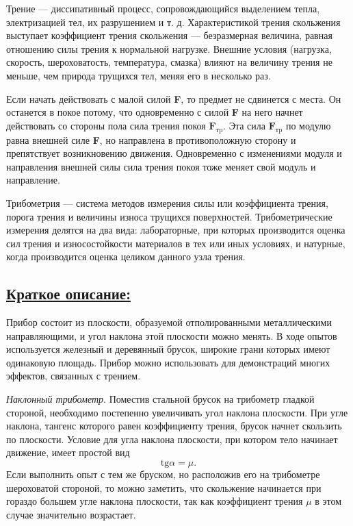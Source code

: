 \documentclass[14pt,a4paper,oneside]{extarticle}	%
\begin{document}
	Трение — диссипативный процесс, 
	сопровождающийся выделением тепла, электризацией тел, их разрушением и т. д. 
	Характеристикой трения скольжения выступает коэффициент трения 
	скольжения — безразмерная величина, равная отношению силы трения к нормальной нагрузке.
	Внешние условия (нагрузка, скорость, 
	 шероховатость, температура, смазка) влияют на величину 
	 трения не меньше, чем природа трущихся тел, меняя его в несколько раз.
	
	Если начать действовать с малой силой \textbf{F}, то предмет не сдвинется с места. 
	Он останется в покое потому, что одновременно с силой \textbf{F} на него начнет действовать со 
	стороны пола сила трения покоя $ \textbf{F}_{\text{тp}} $.
	Эта сила $ \textbf{F}_{\text{тp}} $ по модулю равна внешней силе \textbf{F}, но направлена в противоположную сторону и препятствует 	возникновению движения.
	Одновременно с изменениями модуля и направления внешней силы сила трения покоя тоже меняет свой 
	модуль и направление. 	
	
	Трибометрия — система методов измерения силы или 
	коэффициента трения, порога трения и величины износа трущихся поверхностей. 
	Трибометрические измерения делятся на два вида: 
	лабораторные, при которых производится оценка сил трения и износостойкости материалов 
	в тех или иных условиях, и натурные, когда производится оценка целиком данного узла трения.

	\newpage	
	\subsection*{\underline{Краткое описание:}}
	
	Прибор состоит из плоскости, образуемой отполированными металлическими направляющими, и угол наклона этой плоскости можно менять.
	В ходе опытов используется железный и деревянный брусок, широкие грани которых имеют одинаковую площадь.
	Прибор можно использовать для демонстраций многих эффектов, связанных с трением.
	
	\textit{Наклонный трибометр}.	
	Поместив стальной брусок на трибометр гладкой стороной, необходимо постепенно увеличивать угол наклона плоскости.
	При угле наклона, тангенс которого равен коэффициенту трения, брусок начнет скользить по плоскости.
	Условие для угла наклона плоскости, при котором тело начинает движение, имеет простой вид
		 $$ \text{tg}\alpha=\mu. $$
	Если выполнить опыт с тем же бруском, но расположив его на трибометре шероховатой стороной, 
	то можно заметить, что скольжение начинается при гораздо большем угле наклона плоскости, 
	так как коэффициент трения $  \mu $ в этом случае значительно возрастает.
	
\end{document}
